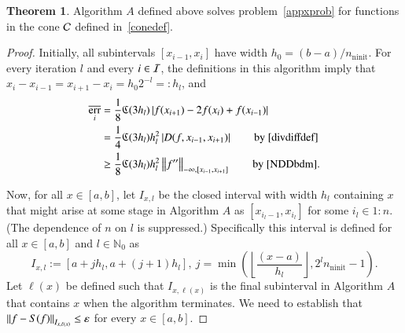 \documentclass[review]{elsarticle}
\newcommand{\abstol}{\varepsilon}
\newcommand{\oton}{1\!:\!n}
\theoremstyle{definition}
\newcommand{\Ixl}{I_{x,l}}
\DeclareMathOperator{\ninit}{ninit}
\DeclareMathOperator{\oerr}{\overline{err}}
\newtheorem{theorem}{Theorem}
\begin{document}
\begin{theorem} \label{thm:algAworks}
	Algorithm $A$ defined above solves problem~\eqref{appxprob} for functions in the
	cone $\mathcal{C}$ defined in~\eqref{conedef}.
\end{theorem}

\begin{proof} 
Initially, all subintervals $[x_{i-1},x_i]$ have width $h_0 = (b-a)/n_{\ninit}$.
For every iteration $l$ and every $i \in \mathcal{I}$, the definitions in this algorithm
imply that $x_i-x_{i-1} = x_{i+1} - x_i = h_0 2^{-l} =: h_l$, and
	\begin{align}
	\nonumber
	\oerr_i & =\frac{1}{8} \fC(3h_l)\abs{f(x_{i+1}) - 2f(x_i) + f(x_{i-1})}  \\ 
	& =  \frac{1}{4} \fC(3h_l) h_l^2 \abs{D(f,x_{i-1},x_{i+1})}  
	\qquad \text{by \eqref{divdiffdef}}  \label{divdiffbd}\\
	& \ge \frac{1} 8 \fC(3h_l) h_l^2 \norm[-\infty,{[x_{i-1},x_{i+1}]}]{f''}  
	\qquad \text{by \eqref{NDDbdm}}. \label{oerrbd}
	\end{align}
	
Now, for all $x \in [a,b]$, let $\Ixl$ be the closed interval with width $h_l$
containing $x$ that might arise at some stage in Algorithm $A$ as $[x_{i_l-1},
x_{i_l}]$ for some $i_l \in \oton$. (The dependence of $n$ on $l$ is
suppressed.) Specifically this interval is defined for all $ x \in [a,b]$ and $l
\in \mathbb{N}_0$ as
	\begin{equation}\label{Ixldef}
	\Ixl := \left[a+jh_l,a+(j+1) h_l\right], \ j=\min \left(\left\lfloor\frac{(x-a)}{h_l}\right\rfloor, 
	2^l n_{\ninit}-1 \right ).
	\end{equation}
Let $\ell(x)$ be defined such that $I_{x,\ell(x)}$ is the final subinterval in
Algorithm $A$ that contains $x$ when the algorithm terminates. We need to
establish that $\norm[I_{x,\ell(x)}]{f - S(f)} \le \abstol$ for every $x \in
[a,b]$.


\end{proof}
\end{document}
